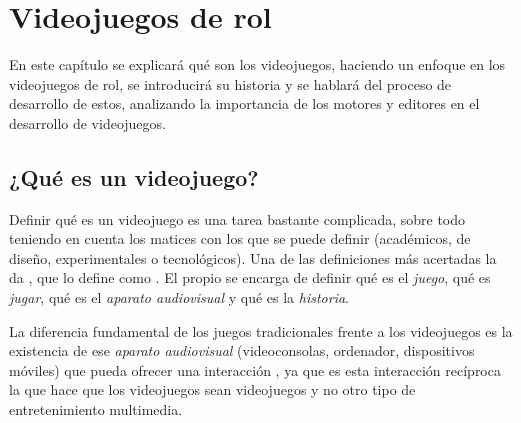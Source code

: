 \chapter{Videojuegos de rol}
\label{cap:videojuegosrol}

\begin{resumen}
En este capítulo se explicará qué son los videojuegos, haciendo un enfoque en los videojuegos de rol, se introducirá su historia y se hablará del proceso de desarrollo de estos, analizando la importancia de los motores y editores en el desarrollo de videojuegos.
\end{resumen}

\section{¿Qué es un videojuego?}
Definir qué es un videojuego es una tarea bastante complicada, sobre todo teniendo en cuenta los matices con los que se puede definir (académicos, de diseño, experimentales o tecnológicos). Una de las definiciones más acertadas la da \cite{EspositoVJ}, que lo define como . El propio \citeauthor{EspositoVJ} se encarga de definir qué es el \textit{juego}, qué es \textit{jugar}, qué es el \textit{aparato audiovisual} y qué es la \textit{historia}.

\smallskip

La diferencia fundamental de los juegos tradicionales frente a los videojuegos es la existencia de ese \textit{aparato audiovisual} (videoconsolas, ordenador, dispositivos móviles) que pueda ofrecer una interacción , ya que es esta interacción recíproca la que hace que los videojuegos sean videojuegos y no otro tipo de entretenimiento multimedia.

\medskip

